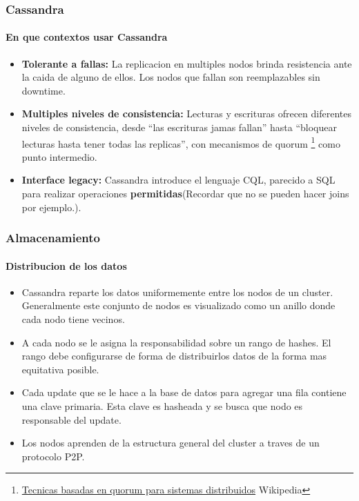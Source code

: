 \documentclass{beamer}
\begin{document}
\begin{frame}
  \frametitle{Cassandra}
  \framesubtitle{En que contextos usar Cassandra}
  \begin{itemize}
    \setlength{\itemsep}{3pt}
    \item \textbf{Tolerante a fallas: } La replicacion en multiples nodos brinda resistencia ante la caida de alguno de ellos. Los nodos que fallan son reemplazables sin downtime.
    \pause
    \item \textbf{Multiples niveles de consistencia: } Lecturas y escrituras ofrecen diferentes niveles de consistencia, desde ``las escrituras jamas fallan'' hasta ``bloquear lecturas hasta tener todas las replicas'', con mecanismos de quorum \footnote{ \href{https://en.wikipedia.org/wiki/Quorum_(distributed_computing)}{Tecnicas basadas en quorum para sistemas distribuidos} Wikipedia} como punto intermedio.
    \pause
    \item \textbf{Interface legacy: } Cassandra introduce el lenguaje CQL, parecido a SQL para realizar operaciones \textbf{permitidas}(Recordar que no se pueden hacer joins por ejemplo.).
  \end{itemize}
\end{frame}




\begin{frame}
  \frametitle{Almacenamiento}
  \framesubtitle{Distribucion de los datos}
   
  \begin{itemize}
    \setlength{\itemsep}{2pt}
    \item Cassandra reparte los datos uniformemente entre los nodos de un cluster. Generalmente este conjunto de nodos es visualizado como un anillo donde cada nodo tiene vecinos.
    \pause
    \item A cada nodo se le asigna la responsabilidad sobre un rango de hashes. El rango debe configurarse de forma de distribuirlos datos de la forma mas equitativa posible. 
    \pause
    \item Cada update que se le hace a la base de datos para agregar una fila contiene una clave primaria. Esta clave es hasheada y se busca que nodo es responsable del update.
    \pause
    \item Los nodos aprenden de la estructura general del cluster a traves de un protocolo P2P.


    \end{itemize}
\end{frame}
\end{document}
